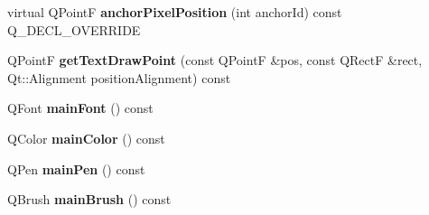 \begin{DoxyCompactItemize}
virtual Q\+PointF {\bfseries anchor\+Pixel\+Position} (int anchor\+Id) const Q\+\_\+\+D\+E\+C\+L\+\_\+\+O\+V\+E\+R\+R\+I\+DE
\item 
\mbox{\label{class_q_c_p_item_text_a4c76ad7e33c50aff0a60b8f38fe6060e}} 
Q\+PointF {\bfseries get\+Text\+Draw\+Point} (const Q\+PointF \&pos, const Q\+RectF \&rect, Qt\+::\+Alignment position\+Alignment) const
\item 
\mbox{\label{class_q_c_p_item_text_af30ac2a0b84afa86a1dec22ab48dd07d}} 
Q\+Font {\bfseries main\+Font} () const
\item 
\mbox{\label{class_q_c_p_item_text_abe3f10805baf62797cb91fd4a4464fcc}} 
Q\+Color {\bfseries main\+Color} () const
\item 
\mbox{\label{class_q_c_p_item_text_a2f67fcbb7ac10ea9a94c4ecc3b0f4dfc}} 
Q\+Pen {\bfseries main\+Pen} () const
\item 
\mbox{\label{class_q_c_p_item_text_acddddd3ce88cfc87ab57b1ec4b25acb9}} 
Q\+Brush {\bfseries main\+Brush} () const
\end{DoxyCompactItemize}

